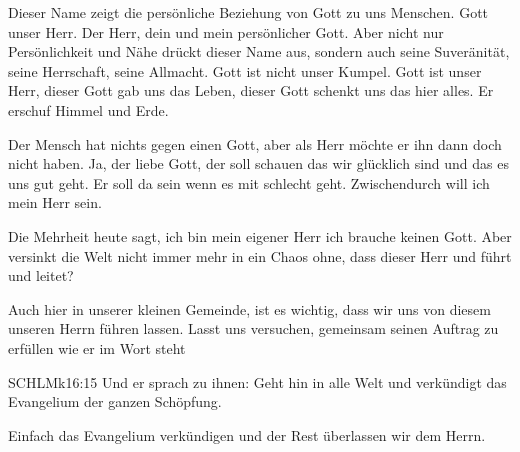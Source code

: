     \begin{otsblock}[Ende]

        Dieser Name zeigt die persönliche Beziehung von Gott zu uns Menschen. Gott unser Herr. Der Herr, dein und mein persönlicher Gott. Aber nicht nur Persönlichkeit und Nähe drückt dieser Name aus, sondern auch seine Suveränität, seine Herrschaft, seine Allmacht. Gott ist nicht unser Kumpel. Gott ist unser Herr, dieser Gott gab uns das Leben, dieser Gott schenkt uns das hier alles. Er erschuf Himmel und Erde. 
        
        Der Mensch hat nichts gegen einen Gott, aber als Herr möchte er ihn dann doch nicht haben. Ja, der liebe Gott, der soll schauen das wir glücklich sind und das es uns gut geht. Er soll da sein wenn es mit schlecht geht. Zwischendurch will ich mein Herr sein.

        Die Mehrheit heute sagt, ich bin mein eigener Herr ich brauche keinen Gott. Aber versinkt die Welt nicht immer mehr in ein Chaos ohne, dass dieser Herr und führt und leitet?

        Auch hier in unserer kleinen Gemeinde, ist es wichtig, dass wir uns von diesem unseren Herrn führen lassen. Lasst uns versuchen, gemeinsam seinen Auftrag zu erfüllen wie er im Wort steht
        \begin{bibelbox}{SCHL}{Mk}{16:15}
            Und er sprach zu ihnen: Geht hin in alle Welt und verkündigt das Evangelium der ganzen Schöpfung.
        \end{bibelbox}
        Einfach das Evangelium verkündigen und der Rest überlassen wir dem Herrn.

    \end{otsblock}